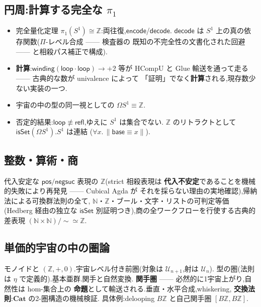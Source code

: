 \documentclass[11pt]{ltjsarticle}
\newcommand{\Z}{\mathbb{Z}}
\newcommand{\N}{\mathbb{N}}
\newcommand{\U}{\mathcal{U}}
\newcommand{\op}[1]{\ensuremath{\mathsf{#1}}}
\begin{document}
\subsection{円周:計算する完全な $\pi_1$}
\begin{itemize}[leftmargin=1.5em]
\item 完全量化定理 $\pi_1(S^1)\cong\Z$:両往復,$\op{encode}$/$\op{decode}$.
$\op{decode}$ は $S^1$ 上の真の依存関数($\Pi$-レベル合成 —— 検査器の
既知の不完全性の文書化された回避 —— と相殺パス補正で構成).
\item \textbf{計算}:$\op{winding}(\op{loop}\cdot\op{loop})\longrightarrow+2$
等が HCompU と Glue 輸送を通って走る —— 古典的な数が univalence によって
「証明」でなく\textbf{計算}される,現存数少ない実装の一つ.
\item 宇宙の中の型の同一視としての $\Omega S^1\equiv\Z$.
\item 否定的結果:$\op{loop}\not\equiv\op{refl}$,ゆえに $S^1$ は集合でない.
$\Z$ のリトラクトとして $\op{isSet}(\Omega S^1)$.$S^1$ は連結
($\forall x.\,\lVert\op{base}\equiv x\rVert$).
\end{itemize}

\subsection{整数・算術・商}
代入安定な $\op{pos}/\op{negsuc}$ 表現の $\Z$(strict 相殺表現は
\textbf{代入不安定}であることを機械的失敗により再発見 —— Cubical Agda が
それを採らない理由の実地確認),帰納法による可換群法則の全て,
$\N$・$\Z$・ブール・文字・リストの可判定等価(Hedberg 経由の独立な
$\op{isSet}$ 別証明つき),商の全ワークフローを行使する古典的差表現
$(\N\times\N)/{\sim}\simeq\Z$.

\subsection{単価的宇宙の中の圏論}
モノイドと $(\Z,+,0)$.宇宙レベル付き前圏(対象は $\U_{n+1}$,射は $\U_n$).
型の圏(法則は $\eta$ で定義的).基本亜群.関手と自然変換.
\textbf{関手圏} —— 必然的に1宇宙上がり,自然性は hom-集合上の
\textbf{命題}として輸送される.垂直・水平合成,whiskering,
\textbf{交換法則}:$\mathbf{Cat}$ の2-圏構造の機械検証.
具体例:delooping $B\Z$ と自己関手圏 $[B\Z,B\Z]$.
\end{document}
